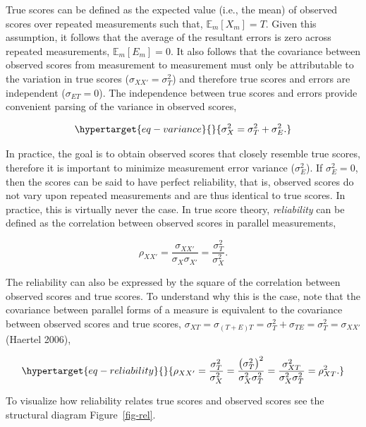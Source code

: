 \documentclass[
  letterpaper,
  DIV=11,
  numbers=noendperiod]{scrreprt}
\begin{document}
True scores can be defined as the expected value (i.e., the mean) of
observed scores over repeated measurements such that,
\(\mathbb{E}_m[X_{m}]=T\). Given this assumption, it follows that the
average of the resultant errors is zero across repeated measurements,
\(\mathbb{E}_m[E_{m}]=0\). It also follows that the covariance between
observed scores from measurement to measurement must only be
attributable to the variation in true scores
(\(\sigma_{XX'}=\sigma^2_{T}\)) and therefore true scores and errors are
independent (\(\sigma_{ET}=0\)). The independence between true scores
and errors provide convenient parsing of the variance in observed
scores,

\begin{equation}\protect\hypertarget{eq-variance}{}{
\sigma_{X}^2 = \sigma_T^2 + \sigma_{E}^2.
}\label{eq-variance}\end{equation}

In practice, the goal is to obtain observed scores that closely resemble
true scores, therefore it is important to minimize measurement error
variance (\(\sigma^2_E\)). If \(\sigma^2_E = 0\), then the scores can be
said to have perfect reliability, that is, observed scores do not vary
upon repeated measurements and are thus identical to true scores. In
practice, this is virtually never the case. In true score theory,
\emph{reliability} can be defined as the correlation between observed
scores in parallel measurements,

\[
\rho_{XX'}=\frac{\sigma_{XX'}}{\sigma_X\sigma_{X'}}  = \frac{\sigma_T^2}{\sigma^2_X}.
\]

The reliability can also be expressed by the square of the correlation
between observed scores and true scores. To understand why this is the
case, note that the covariance between parallel forms of a measure is
equivalent to the covariance between observed scores and true scores,
\(\sigma_{XT}=\)\(\sigma_{(T+E)T}=\)\(\sigma^2_T + \sigma_{TE}=\)\(\sigma^2_T = \sigma_{XX'}\)
(Haertel 2006),

\begin{equation}\protect\hypertarget{eq-reliability}{}{
\rho_{XX'} = \frac{\sigma_T^2}{\sigma_X^2} = \frac{\left(\sigma_T^2\right)^2}{\sigma_X^2 \sigma_T^2}= \frac{\sigma_{XT}^2}{\sigma^2_X\sigma^2_T} = \rho^2_{XT}.
}\label{eq-reliability}\end{equation}

To visualize how reliability relates true scores and observed scores see
the structural diagram Figure~\ref{fig-rel}.
\end{document}
